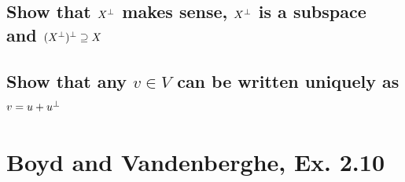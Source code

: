 \documentclass[11pt,a4paper]{article}
\begin{document}
\newpage
\subsection{Show that $X^{\perp}$ makes sense, $X^{\perp}$ is a subspace and
    $(X^{\perp})^{\perp} \supseteq X$}

\subsection{Show that any $v \in V$ can be written uniquely as $v = u + u^{\perp}$} 

\newpage
\section{Boyd and Vandenberghe, Ex. 2.10}
\newcommand{\Snp}{\ensuremath{\mathbb{S}_{+}^{n}}}
\newcommand{\x}[1]{\ensuremath{\mathbf{x}_{#1}}}
\newcommand{\linear}[1]{\ensuremath{b^T #1}}
\newcommand{\quadratic}[1]{\ensuremath{#1^{T} A #1}}
\newcommand{\nsquadratic}[2]{\ensuremath{#1^{T} A #2}}
\newcommand{\quacombo}[1]{\ensuremath{\quadratic{#1} + \linear{#1} + c}}
\newcommand{\xcombo}{\ensuremath{\lambda \x{1} + (1-\lambda) \x{2}}}
\end{document}
